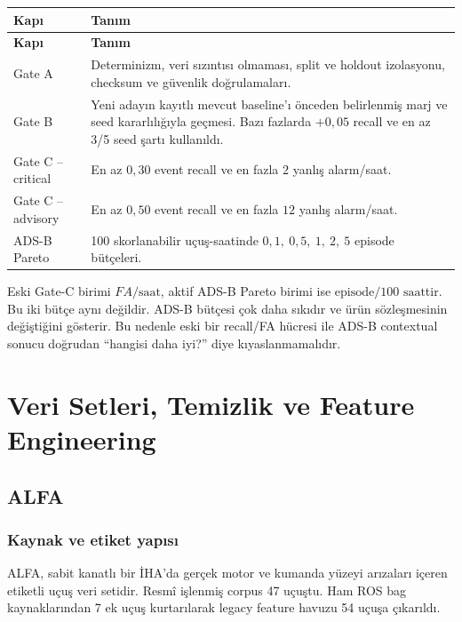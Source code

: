 \documentclass[11pt,a4paper,oneside]{report}
\newcommand{\fasaat}{yanlış alarm/saat}
\newcommand{\FA}{FA}
\begin{document}
\begin{longtable}{L{0.18\textwidth}L{0.72\textwidth}}
\toprule
\textbf{Kapı} & \textbf{Tanım}\\
\midrule
\endfirsthead
\toprule
\textbf{Kapı} & \textbf{Tanım}\\
\midrule
\endhead
Gate A & Determinizm, veri sızıntısı olmaması, split ve holdout izolasyonu, checksum ve güvenlik doğrulamaları.\\
Gate B & Yeni adayın kayıtlı mevcut baseline'ı önceden belirlenmiş marj ve seed kararlılığıyla geçmesi. Bazı fazlarda \(+0{,}05\) recall ve en az 3/5 seed şartı kullanıldı.\\
Gate C -- critical & En az \(0{,}30\) event recall ve en fazla \(2\) \fasaat.\\
Gate C -- advisory & En az \(0{,}50\) event recall ve en fazla \(12\) \fasaat.\\
ADS-B Pareto & 100 skorlanabilir uçuş-saatinde \(0{,}1,\ 0{,}5,\ 1,\ 2,\ 5\) episode bütçeleri.\\
\bottomrule
\end{longtable}

\begin{warningbox}
Eski Gate-C birimi \(\FA/\text{saat}\), aktif ADS-B Pareto birimi ise
\(\text{episode}/100\text{ saat}\)tir. Bu iki bütçe aynı değildir. ADS-B
bütçesi çok daha sıkıdır ve ürün sözleşmesinin değiştiğini gösterir. Bu
nedenle eski bir recall/FA hücresi ile ADS-B contextual sonucu doğrudan
``hangisi daha iyi?'' diye kıyaslanmamalıdır.
\end{warningbox}

\chapter{Veri Setleri, Temizlik ve Feature Engineering}

\section{ALFA}

\subsection{Kaynak ve etiket yapısı}

ALFA, sabit kanatlı bir İHA'da gerçek motor ve kumanda yüzeyi arızaları
içeren etiketli uçuş veri setidir. Resmî işlenmiş corpus 47 uçuştu. Ham ROS
bag kaynaklarından 7 ek uçuş kurtarılarak legacy feature havuzu 54 uçuşa
çıkarıldı.
\end{document}
